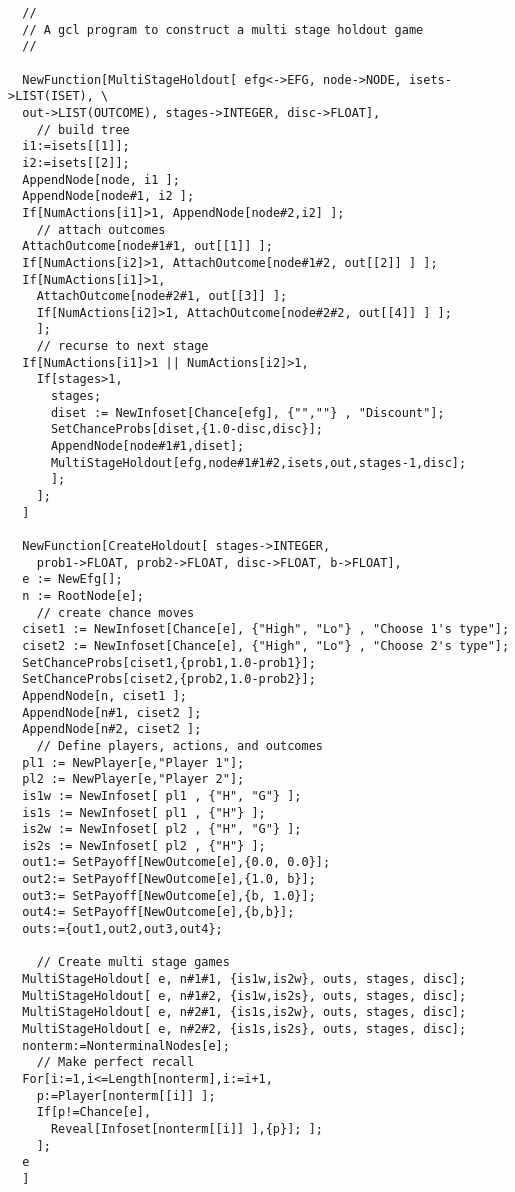 {\scriptsize 
\begin{verbatim}
  //
  // A gcl program to construct a multi stage holdout game
  //

  NewFunction[MultiStageHoldout[ efg<->EFG, node->NODE, isets->LIST(ISET), \
  out->LIST(OUTCOME), stages->INTEGER, disc->FLOAT],
    // build tree
  i1:=isets[[1]];
  i2:=isets[[2]];
  AppendNode[node, i1 ];
  AppendNode[node#1, i2 ];
  If[NumActions[i1]>1, AppendNode[node#2,i2] ];
    // attach outcomes
  AttachOutcome[node#1#1, out[[1]] ]; 
  If[NumActions[i2]>1, AttachOutcome[node#1#2, out[[2]] ] ];
  If[NumActions[i1]>1, 
    AttachOutcome[node#2#1, out[[3]] ];
    If[NumActions[i2]>1, AttachOutcome[node#2#2, out[[4]] ] ];
    ];
    // recurse to next stage
  If[NumActions[i1]>1 || NumActions[i2]>1,
    If[stages>1,
      stages;
      diset := NewInfoset[Chance[efg], {"",""} , "Discount"];
      SetChanceProbs[diset,{1.0-disc,disc}];
      AppendNode[node#1#1,diset];
      MultiStageHoldout[efg,node#1#1#2,isets,out,stages-1,disc];
      ];
    ];
  ]

  NewFunction[CreateHoldout[ stages->INTEGER,
    prob1->FLOAT, prob2->FLOAT, disc->FLOAT, b->FLOAT],
  e := NewEfg[];
  n := RootNode[e];
    // create chance moves
  ciset1 := NewInfoset[Chance[e], {"High", "Lo"} , "Choose 1's type"];
  ciset2 := NewInfoset[Chance[e], {"High", "Lo"} , "Choose 2's type"];
  SetChanceProbs[ciset1,{prob1,1.0-prob1}];
  SetChanceProbs[ciset2,{prob2,1.0-prob2}];
  AppendNode[n, ciset1 ];
  AppendNode[n#1, ciset2 ];
  AppendNode[n#2, ciset2 ];
    // Define players, actions, and outcomes
  pl1 := NewPlayer[e,"Player 1"];
  pl2 := NewPlayer[e,"Player 2"];
  is1w := NewInfoset[ pl1 , {"H", "G"} ];
  is1s := NewInfoset[ pl1 , {"H"} ];
  is2w := NewInfoset[ pl2 , {"H", "G"} ];
  is2s := NewInfoset[ pl2 , {"H"} ];
  out1:= SetPayoff[NewOutcome[e],{0.0, 0.0}];
  out2:= SetPayoff[NewOutcome[e],{1.0, b}];
  out3:= SetPayoff[NewOutcome[e],{b, 1.0}];
  out4:= SetPayoff[NewOutcome[e],{b,b}];
  outs:={out1,out2,out3,out4};

    // Create multi stage games
  MultiStageHoldout[ e, n#1#1, {is1w,is2w}, outs, stages, disc];
  MultiStageHoldout[ e, n#1#2, {is1w,is2s}, outs, stages, disc];
  MultiStageHoldout[ e, n#2#1, {is1s,is2w}, outs, stages, disc];
  MultiStageHoldout[ e, n#2#2, {is1s,is2s}, outs, stages, disc];
  nonterm:=NonterminalNodes[e];
    // Make perfect recall 
  For[i:=1,i<=Length[nonterm],i:=i+1,
    p:=Player[nonterm[[i]] ];
    If[p!=Chance[e],
      Reveal[Infoset[nonterm[[i]] ],{p}]; ];
    ];	 
  e
  ]
\end{verbatim}
}


